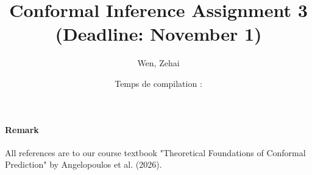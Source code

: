 \documentclass[../../main.tex]{subfiles}
\title{Conformal Inference Assignment 3 \\ (Deadline: November 1)}
\author{Wen, Zehai }
\date{Temps de compilation : \DTMnow}
\begin{document}
\maketitle

\paragraph{Remark}
All references are to our course textbook "Theoretical Foundations of Conformal Prediction"
by Angelopoulos et al. (2026).


\clearpage

\clearpage

\clearpage

\end{document}
